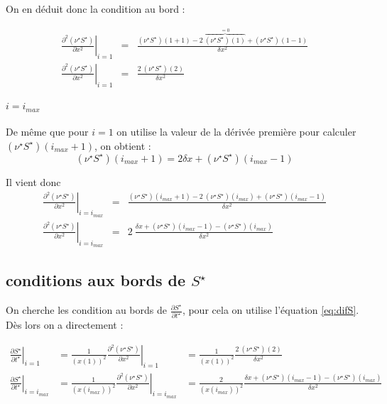 On en déduit donc la condition au bord :

\begin{eqnarray}
\left. \frac{\partial^2 (\nu^{\star} S^{\star})}{\partial x^2}\right|_{i=1} &=& \frac{(\nu^{\star} S^{\star})(1+1) -2\ \overbrace{(\nu^{\star} S^{\star})(1)}^{=0}+ (\nu^{\star} S^{\star})(1-1)}{\delta x ^2} \\
\left. \frac{\partial^2 (\nu^{\star} S^{\star})}{\partial x^2}\right|_{i=1} &=& \frac{2\ (\nu^{\star} S^{\star})(2)}{\delta x ^2}
\end{eqnarray}

\paragraph{$i=i_{max}$}
De même que pour $i=1$ on utilise la valeur de la dérivée première pour calculer $(\nu^{\star} S^{\star})(i_{max}+1)$, on obtient :
\begin{equation}
(\nu^{\star} S^{\star})(i_{max}+1)=2\delta x + (\nu^{\star} S^{\star})(i_{max}-1)
\end{equation}

Il vient donc 
\begin{eqnarray}
\left. \frac{\partial^2 (\nu^{\star} S^{\star})}{\partial x^2}\right|_{i=i_{max}} &=& \frac{(\nu^{\star} S^{\star})(i_{max}+1) - 2\ (\nu^{\star} S^{\star})(i_{max}) + (\nu^{\star} S^{\star})(i_{max}-1)}{\delta x^2}\\
\left. \frac{\partial^2 (\nu^{\star} S^{\star})}{\partial x^2}\right|_{i=i_{max}} &=& 2\ \frac{\delta x + (\nu^{\star} S^{\star})(i_{max}-1)- (\nu^{\star} S^{\star})(i_{max})}{\delta x^2}
\end{eqnarray}

\subsection{conditions aux bords de $S^{\star}$}
On cherche les condition au bords de $\frac{\partial S^{\star}}{\partial t^{\star}}$, pour cela on utilise l'équation \eqref{eq:difS}. Dès lors on a directement :

\begin{eqnarray}
\left. \frac{\partial S^{\star}}{\partial t^{\star}} \right|_{i=1} &= \frac{1}{(x(1))^2} \left. \frac{\partial^2 (\nu^{\star} S^{\star})}{\partial x^2}\right|_{i=1} &= \frac{1}{(x(1))^2} \frac{2\ (\nu^{\star} S^{\star})(2)}{\delta x ^2}\\
\left. \frac{\partial S^{\star}}{\partial t^{\star}} \right|_{i=i_{max}}&= \frac{1}{(x(i_{max}))^2} \left. \frac{\partial^2 (\nu^{\star} S^{\star})}{\partial x^2}\right|_{i=i_{max}} &= \frac{2}{(x(i_{max}))^2} \frac{\delta x + (\nu^{\star} S^{\star})(i_{max}-1)- (\nu^{\star} S^{\star})(i_{max})}{\delta x^2}
\end{eqnarray}

